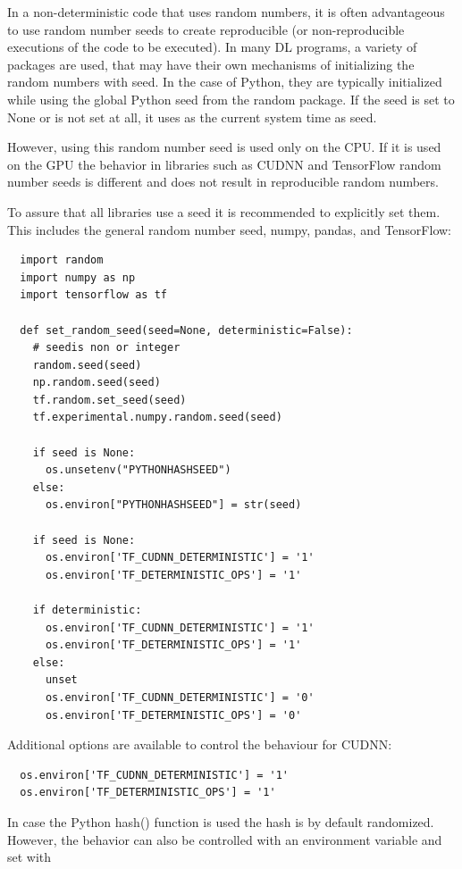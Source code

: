 \documentclass[sigplan,screen]{acmart}
\begin{document}
In a non-deterministic code that uses random numbers, it is often advantageous to use random number seeds to create reproducible (or non-reproducible executions of the code to be executed). In many DL programs, a variety of packages are used, that may have their own mechanisms of initializing the random numbers with seed. In the case of Python, they are typically initialized while using the global Python seed from the random package. If the seed is set to None or is not set at all, it uses as 
the current system time as seed.

However, using this random number seed is used only on the CPU. If it is used on the GPU the behavior in libraries such as CUDNN \cite{www-cudnn-seed} and TensorFlow random number seeds is different and does not result in reproducible random numbers. 


To assure that all libraries use a seed it is recommended to explicitly set them. This includes the general random number seed, numpy, pandas, and TensorFlow:

{\footnotesize
\begin{verbatim}
  import random
  import numpy as np
  import tensorflow as tf

  def set_random_seed(seed=None, deterministic=False):
    # seedis non or integer
    random.seed(seed)
    np.random.seed(seed)
    tf.random.set_seed(seed)
    tf.experimental.numpy.random.seed(seed)

    if seed is None:
      os.unsetenv("PYTHONHASHSEED")
    else:
      os.environ["PYTHONHASHSEED"] = str(seed)

    if seed is None:
      os.environ['TF_CUDNN_DETERMINISTIC'] = '1'
      os.environ['TF_DETERMINISTIC_OPS'] = '1'

    if deterministic:
      os.environ['TF_CUDNN_DETERMINISTIC'] = '1'
      os.environ['TF_DETERMINISTIC_OPS'] = '1'
    else:
      unset 
      os.environ['TF_CUDNN_DETERMINISTIC'] = '0'
      os.environ['TF_DETERMINISTIC_OPS'] = '0'
\end{verbatim}}

Additional options are available to control the behaviour for CUDNN:

{\footnotesize
\begin{verbatim}
  os.environ['TF_CUDNN_DETERMINISTIC'] = '1'
  os.environ['TF_DETERMINISTIC_OPS'] = '1'
\end{verbatim}}

In case the Python hash() function is used the hash is by default randomized. However, the behavior can also be controlled with an environment variable and set with 
\end{document}
